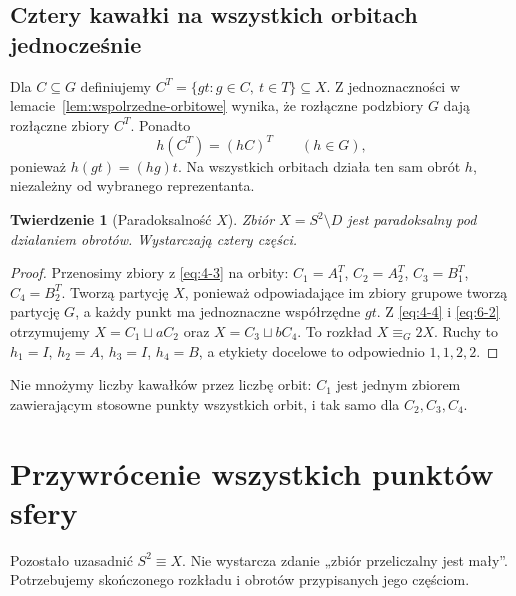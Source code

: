 \documentclass[11pt,a4paper]{article}
\numberwithin{equation}{section}
\theoremstyle{plain}
\newtheorem{twierdzenie}{Twierdzenie}[section]
\theoremstyle{definition}
\theoremstyle{remark}
\newcommand{\equivG}{\mathrel{\equiv_G}}
\begin{document}
\subsection{Cztery kawałki na wszystkich orbitach jednocześnie}
Dla $C\subseteq G$ definiujemy $C^T=\{gt:g\in C,\ t\in T\}\subseteq X$. Z jednoznaczności w lemacie~\ref{lem:wspolrzedne-orbitowe} wynika, że rozłączne podzbiory $G$ dają rozłączne zbiory $C^T$. Ponadto
\begin{equation}\label{eq:6-2}
 h(C^T)=(hC)^T\qquad(h\in G),
\end{equation}
ponieważ $h(gt)=(hg)t$. Na wszystkich orbitach działa ten sam obrót $h$, niezależny od wybranego reprezentanta.
\begin{twierdzenie}[Paradoksalność $X$]\label{tw:paradoksalnosc-x}
Zbiór $X=S^2\setminus D$ jest paradoksalny pod działaniem obrotów. Wystarczają cztery części.
\end{twierdzenie}
\begin{proof}
Przenosimy zbiory z \eqref{eq:4-3} na orbity: $C_1=A_1^T$, $C_2=A_2^T$, $C_3=B_1^T$, $C_4=B_2^T$. Tworzą partycję $X$, ponieważ odpowiadające im zbiory grupowe tworzą partycję $G$, a każdy punkt ma jednoznaczne współrzędne $gt$. Z \eqref{eq:4-4} i \eqref{eq:6-2} otrzymujemy $X=C_1\sqcup aC_2$ oraz $X=C_3\sqcup bC_4$. To rozkład $X\equivG2X$. Ruchy to $h_1=I$, $h_2=A$, $h_3=I$, $h_4=B$, a etykiety docelowe to odpowiednio $1,1,2,2$.
\end{proof}
Nie mnożymy liczby kawałków przez liczbę orbit: $C_1$ jest jednym zbiorem zawierającym stosowne punkty wszystkich orbit, i tak samo dla $C_2,C_3,C_4$.

\section{Przywrócenie wszystkich punktów sfery}
Pozostało uzasadnić $S^2\equiv X$. Nie wystarcza zdanie „zbiór przeliczalny jest mały”. Potrzebujemy skończonego rozkładu i obrotów przypisanych jego częściom.
\end{document}
